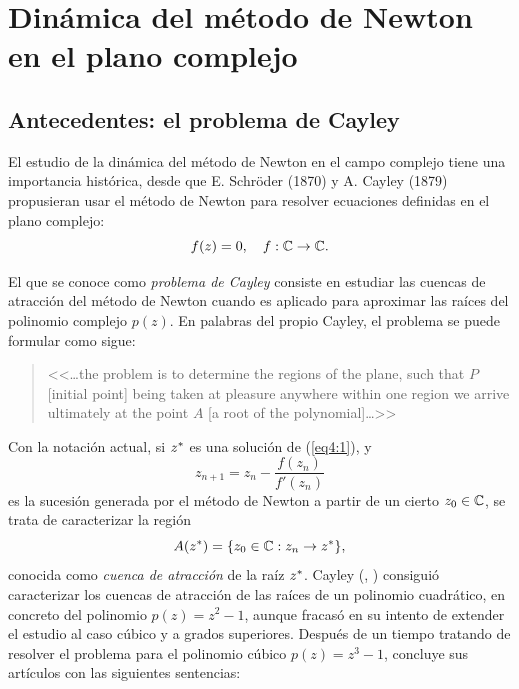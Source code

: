 %

\chapter[Método de Newton en  el plano complejo]{Dinámica del método de Newton en  el plano complejo} 
\label{capitulo4}



\section{Antecedentes: el problema de Cayley}

El estudio de la dinámica del método de Newton en el campo complejo tiene una importancia histórica, desde que E. Schröder (1870) y A. Cayley (1879) propusieran usar el método de Newton para resolver ecuaciones definidas en el plano complejo:
\begin{equation}\label{eq4:1}
f(z)=0, \quad f:\mathbb{C} \to \mathbb{C}.
\end{equation}

El que se conoce como \emph{problema de Cayley} consiste en estudiar las cuencas de atracción del método de Newton cuando es aplicado para aproximar
las raíces del polinomio complejo  $p(z)$. En palabras del propio Cayley, el problema se puede formular como sigue:
\begin{quote}
<<\dots the problem is to determine the regions of the plane, such that $P$ [initial point] being taken at pleasure anywhere within one region we arrive ultimately at the point $A$ [a root of the polynomial]\dots>>
\end{quote}



Con la notación actual, si $z^{\ast}$ es una solución de (\ref{eq4:1}), y
\begin{equation}\label{eq4:2}
z_{n+1}=z_n-\frac{f(z_n)}{f'(z_n)}
\end{equation}
es la sucesión generada por el método de Newton a partir de un cierto $z_0\in \mathbb{C}$, se trata de caracterizar la región
$$
A(z^{\ast})=\{z_0\in \mathbb{C}: z_n\to z^{\ast} \},
$$
conocida como \emph{cuenca de atracción} de la raíz $z^{\ast}$.
Cayley (\cite{Cayley1}, \cite{Cayley2}) consiguió caracterizar los cuencas de atracción de las raíces de un polinomio cuadrático, en concreto del polinomio $p(z)=z^2-1$, aunque fracasó en su intento de extender el estudio al caso cúbico y a grados superiores. Después de un tiempo tratando de resolver el problema para el polinomio cúbico $p(z)=z^3-1$, concluye sus artículos con las  siguientes sentencias:

